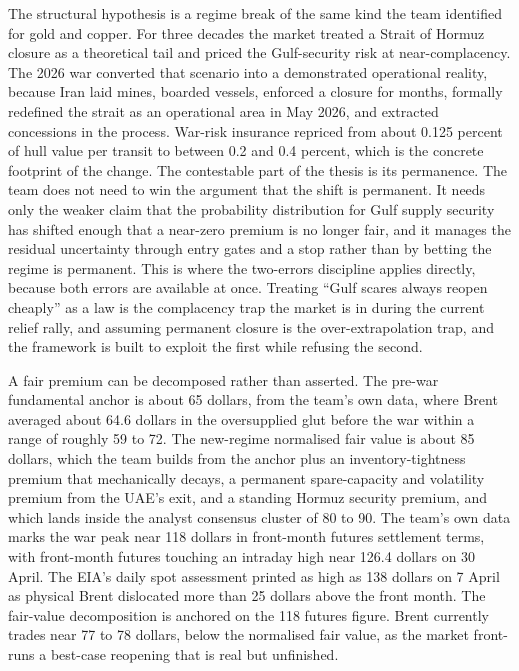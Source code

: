 \documentclass[11pt,a4paper]{article}
\begin{document}
The structural hypothesis is a regime break of the same kind the team identified for gold and copper. For three decades the market treated a Strait of Hormuz closure as a theoretical tail and priced the Gulf-security risk at near-complacency. The 2026 war converted that scenario into a demonstrated operational reality, because Iran laid mines, boarded vessels, enforced a closure for months, formally redefined the strait as an operational area in May 2026, and extracted concessions in the process. War-risk insurance repriced from about 0.125 percent of hull value per transit to between 0.2 and 0.4 percent, which is the concrete footprint of the change. The contestable part of the thesis is its permanence. The team does not need to win the argument that the shift is permanent. It needs only the weaker claim that the probability distribution for Gulf supply security has shifted enough that a near-zero premium is no longer fair, and it manages the residual uncertainty through entry gates and a stop rather than by betting the regime is permanent. This is where the two-errors discipline applies directly, because both errors are available at once. Treating ``Gulf scares always reopen cheaply'' as a law is the complacency trap the market is in during the current relief rally, and assuming permanent closure is the over-extrapolation trap, and the framework is built to exploit the first while refusing the second.

A fair premium can be decomposed rather than asserted. The pre-war fundamental anchor is about 65 dollars, from the team's own data, where Brent averaged about 64.6 dollars in the oversupplied glut before the war within a range of roughly 59 to 72. The new-regime normalised fair value is about 85 dollars, which the team builds from the anchor plus an inventory-tightness premium that mechanically decays, a permanent spare-capacity and volatility premium from the UAE's exit, and a standing Hormuz security premium, and which lands inside the analyst consensus cluster of 80 to 90. The team's own data marks the war peak near 118 dollars in front-month futures settlement terms, with front-month futures touching an intraday high near 126.4 dollars on 30 April. The EIA's daily spot assessment printed as high as 138 dollars on 7 April as physical Brent dislocated more than 25 dollars above the front month. The fair-value decomposition is anchored on the 118 futures figure. Brent currently trades near 77 to 78 dollars, below the normalised fair value, as the market front-runs a best-case reopening that is real but unfinished.
\end{document}
